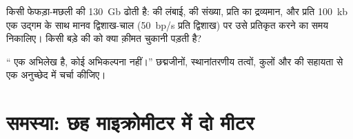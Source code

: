 \begin{exercise}[$\star\star\star$]\label{exo:b1:genomes:11}
किसी फेफड़ा-मछली की  \qty{130}{Gb} ढोती है:  की लंबाई,
 की संख्या, प्रति   का द्रव्यमान, और
प्रति \qty{100}{kb} एक उद्गम के साथ मानव द्विशाख-चाल (\qty{50}{bp/s} प्रति
द्विशाख) पर उसे प्रतिकृत करने का समय निकालिए। किसी बड़े  की 
को क्या क़ीमत चुकानी पड़ती है?
\end{exercise}

\begin{exercise}[$\star\star\star$]\label{exo:b1:genomes:12}
`` एक अभिलेख है, कोई अभिकल्पना नहीं।'' छद्मजीनों, स्थानांतरणीय
तत्वों,  कुलों और  की सहायता से एक अनुच्छेद में चर्चा
कीजिए।
\end{exercise}

\section{समस्या: छह माइक्रोमीटर में दो मीटर}

